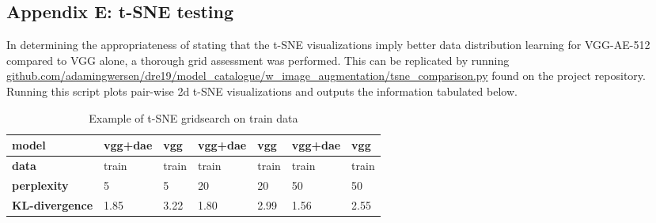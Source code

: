 \subsection*{Appendix E: t-SNE testing} \label{appendix: E}
In determining the appropriateness of stating that the t-SNE visualizations imply better data distribution learning for VGG-AE-512 compared to VGG alone, a thorough grid assessment was performed.
This can be replicated by running \url{github.com/adamingwersen/dre19/model_catalogue/w_image_augmentation/tsne_comparison.py} found on the project repository.
Running this script plots pair-wise 2d t-SNE visualizations and outputs the information tabulated below.

\begin{table}[H]
    \begin{tabular}{@{}lllllll@{}}
    \toprule
    \textbf{model}         & vgg+dae & vgg   & vgg+dae & vgg   & vgg+dae & vgg   \\ \midrule
    \textbf{data}          & train   & train & train   & train & train   & train \\
    \textbf{perplexity}    & 5       & 5     & 20      & 20    & 50      & 50    \\
    \textbf{KL-divergence} & 1.85    & 3.22  & 1.80    & 2.99  & 1.56    & 2.55  \\ \bottomrule
    \end{tabular}
    \caption{Example of t-SNE gridsearch on train data}
    \label{tab:tsnecomp}
\end{table}